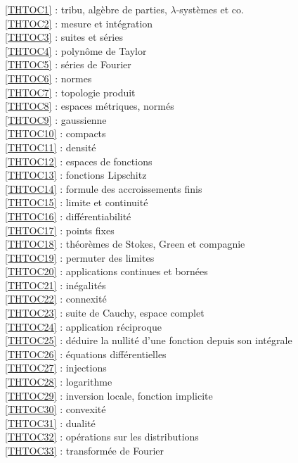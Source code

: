 \ref {THTOC1} : tribu, algèbre de parties, \( \lambda \)-systèmes et co.\\
\ref {THTOC2} : mesure et intégration\\
\ref {THTOC3} : suites et séries\\
\ref {THTOC4} : polynôme de Taylor\\
\ref {THTOC5} : séries de Fourier\\
\ref {THTOC6} : normes\\
\ref {THTOC7} : topologie produit\\
\ref {THTOC8} : espaces métriques, normés\\
\ref {THTOC9} : gaussienne\\
\ref {THTOC10} : compacts\\
\ref {THTOC11} : densité\\
\ref {THTOC12} : espaces de fonctions\\
\ref {THTOC13} : fonctions Lipschitz\\
\ref {THTOC14} : formule des accroissements finis\\
\ref {THTOC15} : limite et continuité\\
\ref {THTOC16} : différentiabilité\\
\ref {THTOC17} : points fixes\\
\ref {THTOC18} : théorèmes de Stokes, Green et compagnie\\
\ref {THTOC19} : permuter des limites\\
\ref {THTOC20} : applications continues et bornées\\
\ref {THTOC21} : inégalités\\
\ref {THTOC22} : connexité\\
\ref {THTOC23} : suite de Cauchy, espace complet\\
\ref {THTOC24} : application réciproque\\
\ref {THTOC25} : déduire la nullité d'une fonction depuis son intégrale\\
\ref {THTOC26} : équations différentielles\\
\ref {THTOC27} : injections\\
\ref {THTOC28} : logarithme\\
\ref {THTOC29} : inversion locale, fonction implicite\\
\ref {THTOC30} : convexité\\
\ref {THTOC31} : dualité\\
\ref {THTOC32} : opérations sur les distributions\\
\ref {THTOC33} : transformée de Fourier\\
